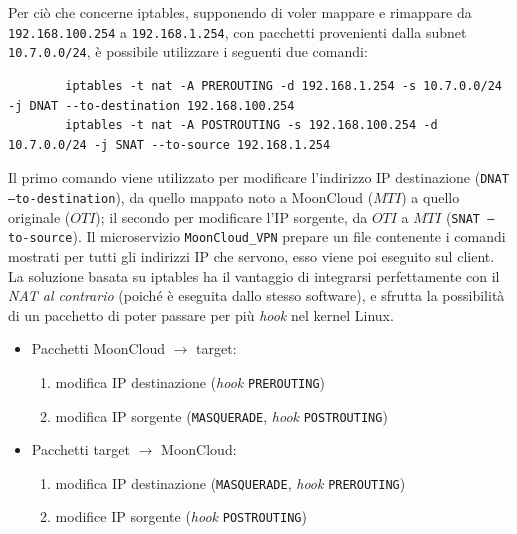 		
	Per ciò che concerne iptables, supponendo di voler mappare e rimappare
	da \texttt{192.168.100.254} a \texttt{192.168.1.254},
	con pacchetti provenienti dalla subnet \texttt{10.7.0.0/24}, è possibile
	utilizzare i seguenti
	due comandi:
	\begin{verbatim}
		iptables -t nat -A PREROUTING -d 192.168.1.254 -s 10.7.0.0/24 -j DNAT --to-destination 192.168.100.254
		iptables -t nat -A POSTROUTING -s 192.168.100.254 -d 10.7.0.0/24 -j SNAT --to-source 192.168.1.254
	\end{verbatim}
	Il primo comando viene utilizzato per modificare l'indirizzo IP destinazione (\texttt{DNAT --to-destination}),
	da quello mappato noto a MoonCloud ($MTI$) a quello originale ($OTI$); il secondo
	per modificare l'IP sorgente, da $OTI$ a $MTI$ (\texttt{SNAT --to-source}). Il microservizio \texttt{MoonCloud\_VPN}
	prepare un file contenente i comandi mostrati per tutti gli indirizzi IP che servono, esso viene
	poi eseguito sul client.\\
	La soluzione basata su iptables ha il vantaggio di integrarsi perfettamente con il \textit{NAT
	al contrario} (poiché è eseguita dallo stesso software), e sfrutta la
	possibilità di un pacchetto di poter passare per più \textit{hook}
	nel kernel Linux.
	\begin{itemize}
		\item Pacchetti MoonCloud $\rightarrow$ target:
		      \begin{enumerate}
		      	\item modifica IP destinazione (\textit{hook} \texttt{PREROUTING})
		      	\item modifica IP sorgente (\texttt{MASQUERADE}, \textit{hook}
		      	      \texttt{POSTROUTING})
		      \end{enumerate}
		\item Pacchetti target $\rightarrow$ MoonCloud:
		      \begin{enumerate}
		      	\item modifica IP destinazione (\texttt{MASQUERADE}, \textit{hook}
		      	      \texttt{PREROUTING})
		      	\item modifice IP sorgente (\textit{hook} \texttt{POSTROUTING})
		      \end{enumerate}
	\end{itemize}
		
